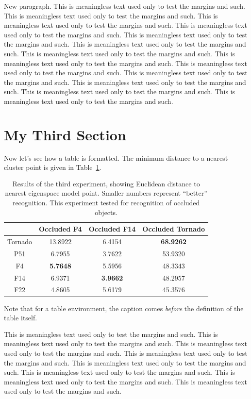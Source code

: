 New paragraph. This is meaningless text used only to test the
margins and such. This is meaningless text used only to test the
margins and such. This is meaningless text used only to test the
margins and such. This is meaningless text used only to test the
margins and such. This is meaningless text used only to test the
margins and such. This is meaningless text used only to test the
margins and such. This is meaningless text used only to test the
margins and such. This is meaningless text used only to test the
margins and such. This is meaningless text used only to test the
margins and such. This is meaningless text used only to test the
margins and such. This is meaningless text used only to test the
margins and such. This is meaningless text used only to test the
margins and such. This is meaningless text used only to test the
margins and such.

\section{My Third Section}

Now let's see how a table is formatted. The minimum distance to a
nearest cluster point is given in Table~\ref{tb:results3}.
\begin{table}%
\begin{center}
\caption[Results of the experiment testing for recognition of
occluded objects.]{Results of the third experiment, showing
Euclidean distance to nearest eigenspace model point. Smaller
numbers represent ``better'' recognition. This experiment tested
for recognition of occluded objects.\\}
 \label{tb:results3}
\begin{tabular}{c|c c c} \hline
  & Occluded F4 & Occluded F14 & Occluded Tornado \\ \hline
  Tornado & 13.8922 & 6.4154 & {\bf 68.9262}\\
  P51 & 6.7955 & 3.7622 & 53.9320 \\
  F4 & {\bf 5.7648} & 5.5956 & 48.3343 \\
  F14 & 6.9371 & {\bf 3.9662} & 48.2957 \\
  F22 & 4.8605 & 5.6179 & 45.3576 \\ \hline
\end{tabular}
\end{center}
\end{table}
Note that for a table environment, the caption comes \emph{before} the
definition of the table itself.

This is meaningless text used only to test the margins and such.
This is meaningless text used only to test the margins and such.
This is meaningless text used only to test the margins and such.
This is meaningless text used only to test the margins and such.
This is meaningless text used only to test the margins and such.
This is meaningless text used only to test the margins and such.
This is meaningless text used only to test the margins and such.
This is meaningless text used only to test the margins and such.


\nocite{*} %
